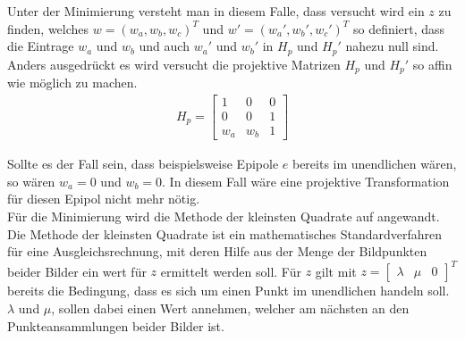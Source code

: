 Unter der Minimierung versteht man in diesem Falle, dass versucht wird ein $z$ zu finden, welches $w = (w_a,w_b,w_c)^T$ und $w'=(w_a',w_b',w_c')^T$ so definiert, dass die Eintrage $w_a$ und $w_b$ und auch $w_a'$ und $w_b'$ in $H_p$ und $H_p'$ nahezu null sind. Anders ausgedrückt es wird versucht die projektive Matrizen $H_p$ und $H_p'$ so affin wie möglich zu machen\cite{ZZ}.\\ 


\begin{gather}
	H_p = 	\begin{bmatrix}
		1&0&0\\
		0&0&1\\
		w_a&w_b&1
	\end{bmatrix}
\end{gather}


Sollte es der Fall sein, dass beispielsweise Epipole $e$ bereits im unendlichen wären, so wären $w_a = 0$ und $w_b = 0$. In diesem Fall wäre eine projektive Transformation für diesen Epipol nicht mehr nötig.\\

Für die Minimierung wird die Methode der kleinsten Quadrate auf angewandt. Die Methode der kleinsten Quadrate ist ein mathematisches Standardverfahren für eine Ausgleichsrechnung, mit deren Hilfe aus der Menge der Bildpunkten beider Bilder ein wert für $z$ ermittelt werden soll\cite{leastSquare}. Für $z$ gilt mit $z = \begin{bmatrix}\lambda&\mu&0\end{bmatrix}^T$ bereits die Bedingung, dass es sich um einen Punkt im unendlichen handeln soll. $\lambda$ und $\mu$, sollen dabei einen Wert annehmen, welcher am nächsten an den Punkteansammlungen beider Bilder ist. \\




